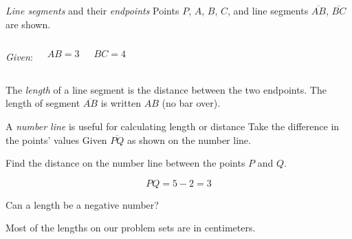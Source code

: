\begin{frame}{\emph{Line segments} and their \emph{endpoints}}
  Points $P$, $A$, $B$, $C$, and line segments $\overline{AB}$, $\overline{BC}$ are shown. \vspace{1cm}
  \begin{columns}
      \emph{Given}:\par $AB=3$ \par $BC=4$
  \end{columns} \vspace{1cm}
  The \emph{length} of a line segment is the distance between the two endpoints. The length of segment $\overline{AB}$ is written $AB$ (no bar over).
  \end{frame}

\begin{frame}{A \emph{number line} is useful for calculating length or distance}
  {Take the difference in the points' values}
  Given $\overline{PQ}$ as shown on the number line.
    \begin{center}
    \end{center}
    Find the distance on the number line between the points $P$ and $Q$. \par \bigskip
     $$PQ = 5-2 =3$$ \par \bigskip
    Can a length be a negative number? \par \vspace{1cm}
    Most of the lengths on our problem sets are in centimeters.
  \end{frame}

